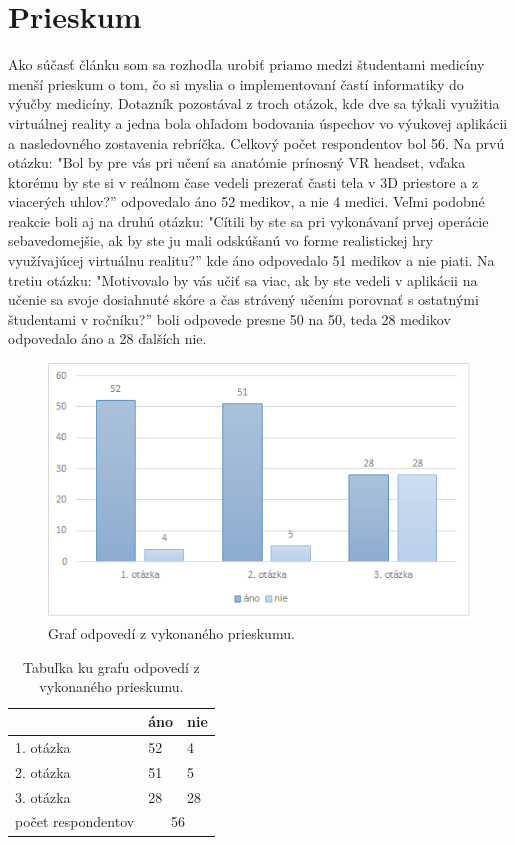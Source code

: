 \documentclass[10pt,twoside,slovak,a4paper]{article}
\begin{document}
\section{Prieskum} \label{prieskum}
Ako súčasť článku som sa rozhodla urobiť priamo medzi študentami medicíny menší prieskum o tom, čo si myslia o implementovaní častí informatiky do výučby medicíny. Dotazník pozostával z troch otázok, kde dve sa týkali využitia virtuálnej reality a jedna bola ohľadom bodovania úspechov vo výukovej aplikácii a nasledovného zostavenia rebríčka. Celkový počet respondentov bol 56. Na prvú otázku: "Bol by pre vás pri učení sa anatómie prínosný VR headset, vďaka ktorému by ste si v reálnom čase vedeli prezerať časti tela v 3D priestore a z viacerých uhlov?'' odpovedalo áno 52 medikov, a nie 4 medici. Veľmi podobné reakcie boli aj na druhú otázku: "Cítili by ste sa pri vykonávaní prvej operácie sebavedomejšie, ak by ste ju mali odskúšanú vo forme realistickej hry využívajúcej virtuálnu realitu?'' kde áno odpovedalo 51 medikov a nie piati. Na tretiu otázku: "Motivovalo by vás učiť sa viac, ak by ste vedeli v aplikácii na učenie sa svoje dosiahnuté skóre a čas strávený učením porovnať s ostatnými študentami v ročníku?'' boli odpovede presne 50 na 50, teda 28 medikov odpovedalo áno a 28 ďalších nie.

\begin{figure}[tbh]
\centering
\includegraphics[scale=0.9]{graf.png}
\caption{Graf odpovedí z vykonaného prieskumu.}
\label{graf}
\end{figure}


\begin{table}[]
\centering
\begin{tabular}{@{}lll@{}}
\toprule
                                & áno                     & nie                     \\ \midrule
\multicolumn{1}{|l|}{1. otázka} & \multicolumn{1}{l|}{52} & \multicolumn{1}{l|}{4}  \\ \midrule
\multicolumn{1}{|l|}{2. otázka} & \multicolumn{1}{l|}{51} & \multicolumn{1}{l|}{5}  \\ \midrule
\multicolumn{1}{|l|}{3. otázka} & \multicolumn{1}{l|}{28} & \multicolumn{1}{l|}{28} \\ \midrule
počet respondentov              & \multicolumn{2}{c}{56}                            \\ \bottomrule
\end{tabular}
\caption{Tabuľka ku grafu odpovedí z vykonaného prieskumu.}
\end{table}
\end{document}
